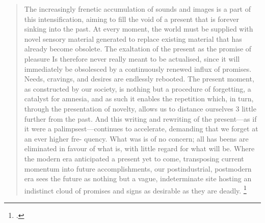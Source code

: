 \begin{quote}
    The increasingly frenetic accumulation of sounds and
    images is a part of this intensification, aiming to fill the void of
    a present that is forever sinking into the past. At every
    moment, the world must be supplied with novel sensory
    material generated to replace existing material that has
    already become obsolete. The exaltation of the present as the
    promise of pleasure Is therefore never really meant to be actualised,
    since it will immediately be obsolesced by a continuously
    renewed influx of promises.
    Needs, cravings, and desires
    are endlessly rebooted.
    The present moment, as constructed by our society, is
    nothing but a procedure of forgetting, a catalyst for amnesia,
    and as such it enables the repetition which, in turn, through
    the presentation of novelty, allows us to distance ourselves
    3 little further from the past. And this writing and rewriting
    of the present—as if it were a palimpsest—continues to
    accelerate, demanding that we forget at an ever higher fre-
    quency. What was is of no concern; all has beens are eliminated
    in favour of what is, with little regard for what will be.
    Where the modern era anticipated a present yet to come,
    transposing current momentum into future accomplishments,
    our postindustrial, postmodern era sees the future as
    nothing but a vague, indeterminate site hosting an indistinct
    cloud of promises and signs as desirable as they are deadly. \footcite{francois_jbonnet_after_death}
\end{quote}

